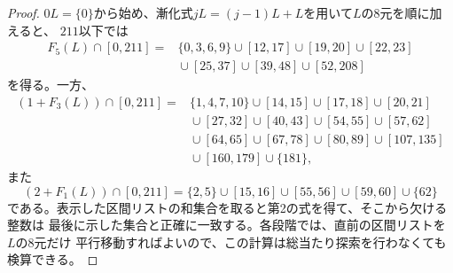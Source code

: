 \documentclass[12pt]{ltjsarticle}
\theoremstyle{plain}
\begin{document}
\begin{proof}
$0L=\{0\}$から始め、漸化式$jL=(j-1)L+L$を用いて$L$の8元を順に加えると、
$211$以下では
\[
\begin{aligned}
F_5(L)\cap[0,211]={}&\{0,3,6,9\}\cup[12,17]\cup[19,20]\cup[22,23]\\
 &{}\cup[25,37]\cup[39,48]\cup[52,208]
\end{aligned}
\]
を得る。一方、
\[
\begin{aligned}
(1+F_3(L))\cap[0,211]
={}&\{1,4,7,10\}\cup[14,15]\cup[17,18]\cup[20,21]\\
 &{}\cup[27,32]\cup[40,43]\cup[54,55]\cup[57,62]\\
 &{}\cup[64,65]\cup[67,78]\cup[80,89]\cup[107,135]\\
 &{}\cup[160,179]\cup\{181\},
\end{aligned}
\]
また
\[
 (2+F_1(L))\cap[0,211]
 =\{2,5\}\cup[15,16]\cup[55,56]\cup[59,60]\cup\{62\}
\]
である。表示した区間リストの和集合を取ると第2の式を得て、そこから欠ける整数は
最後に示した集合と正確に一致する。各段階では、直前の区間リストを$L$の8元だけ
平行移動すればよいので、この計算は総当たり探索を行わなくても検算できる。
\end{proof}
\end{document}
